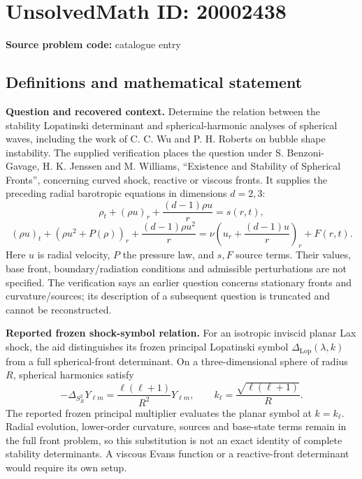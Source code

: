 \documentclass[11pt]{article}
\begin{document}
\section*{UnsolvedMath ID: 20002438}
\textbf{Source problem code:} catalogue entry
\subsection{Definitions and mathematical statement}
\textbf{Question and recovered context.} Determine the relation between the stability Lopatinski determinant and spherical-harmonic analyses of spherical waves, including the work of C. C. Wu and P. H. Roberts on bubble shape instability. The supplied verification places the question under S. Benzoni-Gavage, H. K. Jenssen and M. Williams, ``Existence and Stability of Spherical Fronts'', concerning curved shock, reactive or viscous fronts. It supplies the preceding radial barotropic equations in dimensions \(d=2,3\):
\[
 \rho_t+(\rho u)_r+\frac{(d-1)\rho u}{r}=s(r,t),
\]
\[
 (\rho u)_t+(\rho u^2+P(\rho))_r+\frac{(d-1)\rho u^2}{r}
 =\nu\left(u_r+\frac{(d-1)u}{r}\right)_r+F(r,t).
\]
Here \(u\) is radial velocity, \(P\) the pressure law, and \(s,F\) source terms. Their values, base front, boundary/radiation conditions and admissible perturbations are not specified. The verification says an earlier question concerns stationary fronts and curvature/sources; its description of a subsequent question is truncated and cannot be reconstructed.

\textbf{Reported frozen shock-symbol relation.} For an isotropic inviscid planar Lax shock, the aid distinguishes its frozen principal Lopatinski symbol \(\Delta_{\mathrm{Lop}}(\lambda,k)\) from a full spherical-front determinant. On a three-dimensional sphere of radius \(R\), spherical harmonics satisfy
\[
 -\Delta_{S_R^2}Y_{\ell m}=\frac{\ell(\ell+1)}{R^2}Y_{\ell m},\qquad
 k_\ell=\frac{\sqrt{\ell(\ell+1)}}{R}.
\]
The reported frozen principal multiplier evaluates the planar symbol at \(k=k_\ell\). Radial evolution, lower-order curvature, sources and base-state terms remain in the full front problem, so this substitution is not an exact identity of complete stability determinants. A viscous Evans function or a reactive-front determinant would require its own setup.
\end{document}
